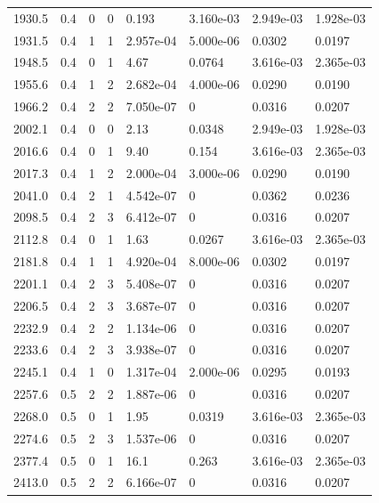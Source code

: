 \documentclass[preview]{standalone}
\begin{document}
{{{\begin{tabular}{L{1.2cm}C{1.2cm} C{0.3cm}C{0.5cm} C{1.4cm}C{1.4cm} C{1.4cm}C{1.4cm}}
  1930.5  &   0.4  & 0     &  0 &  0.193  & 3.160e-03  & 2.949e-03 &  1.928e-03   \\ 
  1931.5  &   0.4  & 1     &  1 &  2.957e-04  & 5.000e-06  & 0.0302 &  0.0197   \\ 
  1948.5  &   0.4  & 0     &  1 &  4.67  & 0.0764  & 3.616e-03 &  2.365e-03   \\ 
  1955.6  &   0.4  & 1     &  2 &  2.682e-04  & 4.000e-06  & 0.0290 &  0.0190   \\ 
  1966.2  &   0.4  & 2     &  2 &  7.050e-07  & 0  & 0.0316 &  0.0207   \\ 
  2002.1  &   0.4  & 0     &  0 &  2.13  & 0.0348  & 2.949e-03 &  1.928e-03   \\ 
  2016.6  &   0.4  & 0     &  1 &  9.40  & 0.154  & 3.616e-03 &  2.365e-03   \\ 
  2017.3  &   0.4  & 1     &  2 &  2.000e-04  & 3.000e-06  & 0.0290 &  0.0190   \\ 
  2041.0  &   0.4  & 2     &  1 &  4.542e-07  & 0  & 0.0362 &  0.0236   \\ 
  2098.5  &   0.4  & 2     &  3 &  6.412e-07  & 0  & 0.0316 &  0.0207   \\ 
  2112.8  &   0.4  & 0     &  1 &  1.63  & 0.0267  & 3.616e-03 &  2.365e-03   \\ 
  2181.8  &   0.4  & 1     &  1 &  4.920e-04  & 8.000e-06  & 0.0302 &  0.0197   \\ 
  2201.1  &   0.4  & 2     &  3 &  5.408e-07  & 0  & 0.0316 &  0.0207   \\ 
  2206.5  &   0.4  & 2     &  3 &  3.687e-07  & 0  & 0.0316 &  0.0207   \\ 
  2232.9  &   0.4  & 2     &  2 &  1.134e-06  & 0  & 0.0316 &  0.0207   \\ 
  2233.6  &   0.4  & 2     &  3 &  3.938e-07  & 0  & 0.0316 &  0.0207   \\ 
  2245.1  &   0.4  & 1     &  0 &  1.317e-04  & 2.000e-06  & 0.0295 &  0.0193   \\ 
  2257.6  &   0.5  & 2     &  2 &  1.887e-06  & 0  & 0.0316 &  0.0207   \\ 
  2268.0  &   0.5  & 0     &  1 &  1.95  & 0.0319  & 3.616e-03 &  2.365e-03   \\ 
  2274.6  &   0.5  & 2     &  3 &  1.537e-06  & 0  & 0.0316 &  0.0207   \\ 
  2377.4  &   0.5  & 0     &  1 &  16.1  & 0.263  & 3.616e-03 &  2.365e-03   \\ 
  2413.0  &   0.5  & 2     &  2 &  6.166e-07  & 0  & 0.0316 &  0.0207   \\ 

\end{tabular}}}}
\end{document}
